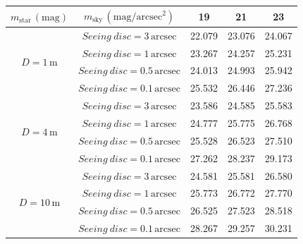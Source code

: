 \documentclass[a4paper,fontset=windows]{ctexart}
\begin{document}
    \vspace{2.5em}\begin{table}[ht!]\Large
        \begin{center}
            \begin{tabular}{ |c|c|c|c|c| }
                \hline
                $m_{\mathrm{star}}\,(\mathrm{mag})$ & $m_{\mathrm{sky}}\,(\mathrm{mag/arcsec^2})$ & 19 & 21 & 23 \\
                \hline
                \multirow{4}{*}{$D = 1\,\mathrm{m}$} & $Seeing\ disc = 3\,\mathrm{arcsec}$ & 22.079 & 23.076 & 24.067 \\
                \cline{2-5}
                & $Seeing\ disc = 1\,\mathrm{arcsec}$ & 23.267 & 24.257 & 25.231 \\
                \cline{2-5}
                & $Seeing\ disc = 0.5\,\mathrm{arcsec}$ & 24.013 & 24.993 & 25.942 \\
                \cline{2-5}
                & $Seeing\ disc = 0.1\,\mathrm{arcsec}$ & 25.532 & 26.446 & 27.236 \\
                \hline
                \multirow{4}{*}{$D = 4\,\mathrm{m}$} & $Seeing\ disc = 3\,\mathrm{arcsec}$ & 23.586 & 24.585 & 25.583 \\
                \cline{2-5}
                & $Seeing\ disc = 1\,\mathrm{arcsec}$ & 24.777 & 25.775 & 26.768 \\
                \cline{2-5}
                & $Seeing\ disc = 0.5\,\mathrm{arcsec}$ & 25.528 & 26.523 & 27.510 \\
                \cline{2-5}
                & $Seeing\ disc = 0.1\,\mathrm{arcsec}$ & 27.262 & 28.237 & 29.173 \\
                \hline
                \multirow{4}{*}{$D = 10\,\mathrm{m}$} & $Seeing\ disc = 3\,\mathrm{arcsec}$ & 24.581 & 25.581 & 26.580 \\
                \cline{2-5}
                & $Seeing\ disc = 1\,\mathrm{arcsec}$ & 25.773 & 26.772 & 27.770 \\
                \cline{2-5}
                & $Seeing\ disc = 0.5\,\mathrm{arcsec}$ & 26.525 & 27.523 & 28.518 \\
                \cline{2-5}
                & $Seeing\ disc = 0.1\,\mathrm{arcsec}$ & 28.267 & 29.257 & 30.231 \\
                \hline
            \end{tabular}
        \end{center}
    \end{table}
\end{document}
